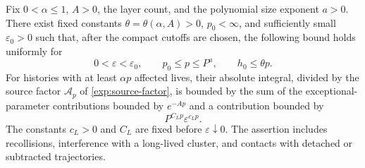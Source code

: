 \begin{proposition}
\label{exp:defects}
Fix $0<\alpha\le1$, $A>0$, the layer count, and the polynomial size
exponent $a>0$.  There exist fixed constants $\theta=\theta(\alpha,A)>0$,
$p_0<\infty$, and sufficiently small $\varepsilon_0>0$ such that, after
the compact cutoffs are chosen, the following bound holds uniformly for
\[
 0<\varepsilon<\varepsilon_0,\qquad
 p_0\le p\le P^a,\qquad h_0\le\theta p.
\]
For histories with at least $\alpha p$ affected lives, their absolute
integral, divided by
the source factor $\mathcal A_p$ of \eqref{exp:source-factor}, is bounded
by the sum of the exceptional-parameter contributions bounded by $e^{-Ap}$
and a contribution bounded by
\begin{equation}
\label{exp:extensive}
 P^{C_Lp}\varepsilon^{c_Lp}.
\end{equation}
The constants $c_L>0$ and $C_L$ are fixed before $\varepsilon\downarrow0$.
The assertion includes recollisions, interference with a long-lived cluster,
and contacts with detached or subtracted trajectories.
\end{proposition}

